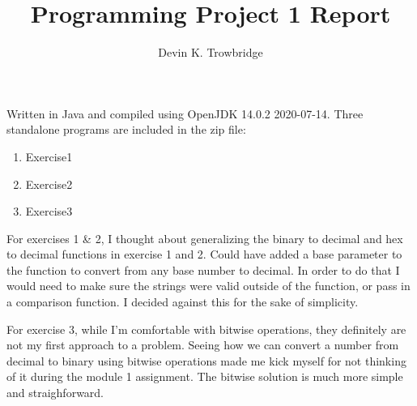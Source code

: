 \documentclass[a4paper,10pt]{article}
\title{Programming Project 1 Report}
\author{Devin K. Trowbridge}
\begin{document}
\maketitle

Written in Java and compiled using OpenJDK 14.0.2 2020-07-14. 
Three standalone programs are included in the zip file:
\begin{enumerate}
  \item Exercise1 
  \item Exercise2 
  \item Exercise3
\end{enumerate}

For exercises 1 \& 2, I thought about generalizing the binary to decimal and hex to decimal functions in exercise 1 and 2. Could have added a base parameter to the function to convert from any base number to decimal. In order to do that I would need to make sure the strings were valid outside of the function, or pass in a comparison function. I decided against this for the sake of simplicity.

For exercise 3, while I'm comfortable with bitwise operations, they definitely are not my first approach to a problem. Seeing how we can convert a number from decimal to binary using bitwise operations made me kick myself for not thinking of it during the module 1 assignment. The bitwise solution is much more simple and straighforward.
\end{document}
